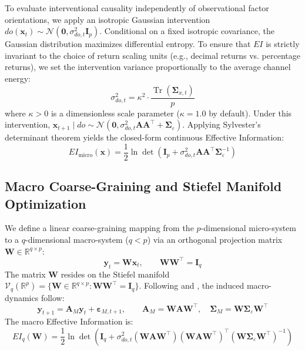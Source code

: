 \documentclass[review,12pt,authoryear]{elsarticle}
\begin{document}
To evaluate interventional causality independently of observational factor orientations, we apply an isotropic Gaussian intervention $do(\mathbf{x}_t) \sim \mathcal{N}(\mathbf{0}, \sigma_{do,t}^2 \mathbf{I}_p)$. Conditional on a fixed isotropic covariance, the Gaussian distribution maximizes differential entropy. To ensure that $EI$ is strictly invariant to the choice of return scaling units (e.g., decimal returns vs. percentage returns), we set the intervention variance proportionally to the average channel energy:
\begin{equation}
\sigma_{do,t}^2 = \kappa^2 \cdot \frac{\operatorname{Tr}(\boldsymbol{\Sigma}_{x,t})}{p}
\label{eq:scale_inv_def}
\end{equation}
where $\kappa > 0$ is a dimensionless scale parameter ($\kappa = 1.0$ by default). Under this intervention, $\mathbf{x}_{t+1} \mid do \sim \mathcal{N}(\mathbf{0}, \sigma_{do,t}^2 \mathbf{A}\mathbf{A}^\top + \boldsymbol{\Sigma}_\varepsilon)$. Applying Sylvester's determinant theorem yields the closed-form continuous Effective Information:
\begin{equation}
EI_{\text{micro}}(\mathbf{x}) = \frac{1}{2} \ln \det\left( \mathbf{I}_p + \sigma_{do,t}^2 \mathbf{A}\mathbf{A}^\top \boldsymbol{\Sigma}_\varepsilon^{-1} \right)
\label{eq:ei_micro_closed}
\end{equation}

\subsection{Macro Coarse-Graining and Stiefel Manifold Optimization}
We define a linear coarse-graining mapping from the $p$-dimensional micro-system to a $q$-dimensional macro-system ($q < p$) via an orthogonal projection matrix $\mathbf{W} \in \mathbb{R}^{q \times p}$:
\begin{equation}
\mathbf{y}_t = \mathbf{W}\mathbf{x}_t, \qquad \mathbf{W}\mathbf{W}^\top = \mathbf{I}_q
\end{equation}
The matrix $\mathbf{W}$ resides on the Stiefel manifold $\mathcal{V}_q(\mathbb{R}^p) = \{ \mathbf{W} \in \mathbb{R}^{q \times p} : \mathbf{W}\mathbf{W}^\top = \mathbf{I}_q \}$. Following \citet{liu2024exact} and \citet{liu2025singular}, the induced macro-dynamics follow:
\begin{equation}
\mathbf{y}_{t+1} = \mathbf{A}_M \mathbf{y}_t + \boldsymbol{\varepsilon}_{M, t+1}, \qquad \mathbf{A}_M = \mathbf{W}\mathbf{A}\mathbf{W}^\top, \quad \boldsymbol{\Sigma}_M = \mathbf{W}\boldsymbol{\Sigma}_\varepsilon \mathbf{W}^\top
\label{eq:macro_dynamics_def}
\end{equation}
The macro Effective Information is:
\begin{equation}
EI_q(\mathbf{W}) = \frac{1}{2} \ln \det\left( \mathbf{I}_q + \sigma_{do,t}^2 (\mathbf{W}\mathbf{A}\mathbf{W}^\top)(\mathbf{W}\mathbf{A}\mathbf{W}^\top)^\top (\mathbf{W}\boldsymbol{\Sigma}_\varepsilon \mathbf{W}^\top)^{-1} \right)
\label{eq:ei_macro_closed}
\end{equation}
\end{document}
